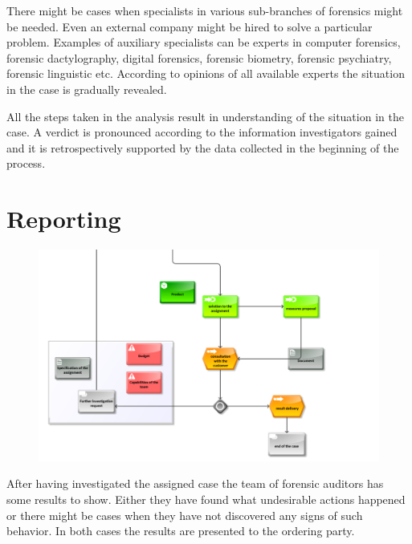 There might be cases when specialists in various sub-branches of forensics might be needed. Even an external company might be hired to solve a particular problem. Examples of auxiliary specialists can be experts in computer forensics, forensic dactylography, digital forensics, forensic biometry, forensic psychiatry, forensic linguistic etc. According to opinions of all available experts the situation in the case is gradually revealed.

All the steps taken in the analysis result in understanding of the situation in the case. A verdict is pronounced according to the information investigators gained and it is retrospectively supported by the data collected in the beginning of the process. 



\section{Reporting}

\begin{figure}[bh!t]
	\begin{center} 
	\includegraphics[width=1.0\textwidth]{img/metodika/metodika4.pdf}
	\end{center}
\end{figure}

After having investigated the assigned case the team of forensic auditors has some results to show. Either they have found what undesirable actions happened or there might be cases when they have not discovered any signs of such behavior. In both cases the results are presented to the ordering party. 


